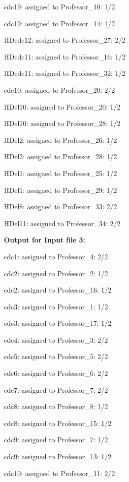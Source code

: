 \documentclass{article} %
\begin{document}
\noindent cdc19: assigned to Professor\_10: 1/2

\noindent cdc19: assigned to Professor\_14: 1/2

\noindent HDcdc12: assigned to Professor\_27: 2/2

\noindent HDcdc11: assigned to Professor\_16: 1/2

\noindent HDcdc11: assigned to Professor\_32: 1/2

\noindent cdc10: assigned to Professor\_20: 2/2

\noindent HDel10: assigned to Professor\_20: 1/2

\noindent HDel10: assigned to Professor\_28: 1/2

\noindent HDel2: assigned to Professor\_26: 1/2

\noindent HDel2: assigned to Professor\_28: 1/2

\noindent HDel1: assigned to Professor\_25: 1/2

\noindent HDel1: assigned to Professor\_29: 1/2

\noindent HDel8: assigned to Professor\_33: 2/2

\noindent HDel11: assigned to Professor\_34: 2/2

\noindent 

\noindent 

\noindent \textbf{Output for Input file 3:}

\noindent cdc1: assigned to Professor\_4: 2/2

\noindent cdc2: assigned to Professor\_2: 1/2

\noindent cdc2: assigned to Professor\_16: 1/2

\noindent cdc3: assigned to Professor\_1: 1/2

\noindent cdc3: assigned to Professor\_17: 1/2

\noindent cdc4: assigned to Professor\_3: 2/2

\noindent cdc5: assigned to Professor\_5: 2/2

\noindent cdc6: assigned to Professor\_6: 2/2

\noindent cdc7: assigned to Professor\_7: 2/2

\noindent cdc8: assigned to Professor\_8: 1/2

\noindent cdc8: assigned to Professor\_15: 1/2

\noindent cdc9: assigned to Professor\_7: 1/2

\noindent cdc9: assigned to Professor\_13: 1/2

\noindent cdc10: assigned to Professor\_11: 2/2
\end{document}
